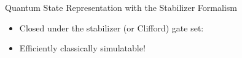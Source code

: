 \begin{refframe}{Quantum State Representation with the
					\alert{Stabilizer Formalism}}
\begin{definition}
\begin{itemize}
with $\pm P_{i,1} \otimes  P_{i,2} \otimes  \dots  \otimes P_{i,n} \cdot \ket{\phi} = \ket{\phi}$ (state $\ket{\phi}$ is stabilized by each Pauli op.)

\pause

\item Closed under the stabilizer (or Clifford) gate set: 

\item Efficiently classically simulatable!
\end{itemize}
\end{definition}



\end{refframe}




